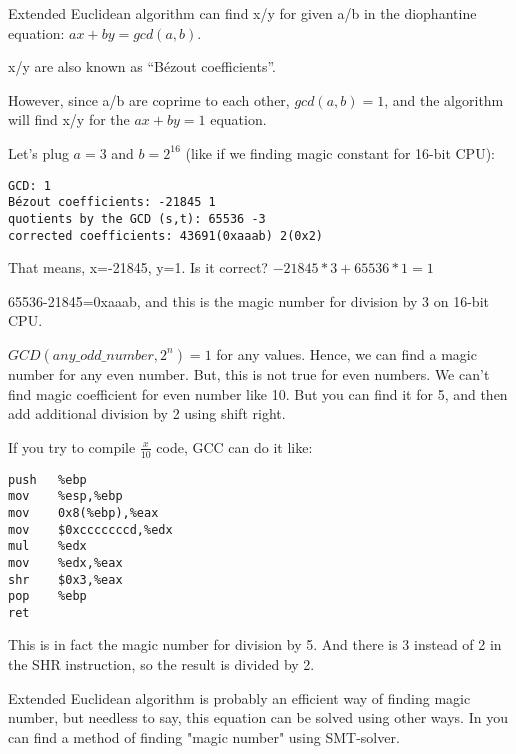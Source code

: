 
Extended Euclidean algorithm can find x/y for given a/b in the diophantine equation:
$ax+by=gcd(a,b)$.

x/y are also known as ``Bézout coefficients''.

However, since a/b are coprime to each other, $gcd(a,b)=1$, and the algorithm will find
x/y for the $ax+by=1$ equation.

Let's plug $a=3$ and $b=2^{16}$ (like if we finding magic constant for 16-bit CPU):



\begin{lstlisting}
GCD: 1
Bézout coefficients: -21845 1
quotients by the GCD (s,t): 65536 -3
corrected coefficients: 43691(0xaaab) 2(0x2)
\end{lstlisting}

That means, x=-21845, y=1.
Is it correct?
$-21845*3 + 65536*1=1$

65536-21845=0xaaab, and this is the magic number for division by 3 on 16-bit CPU.

$GCD(any\_odd\_number, 2^n)=1$ for any values.
Hence, we can find a magic number for any even number.
But, this is not true for even numbers.
We can't find magic coefficient for even number like 10.
But you can find it for 5, and then add additional division by 2 using shift right.

If you try to compile $\frac{x}{10}$ code, GCC can do it like:

\begin{lstlisting}
push   %ebp
mov    %esp,%ebp
mov    0x8(%ebp),%eax
mov    $0xcccccccd,%edx
mul    %edx
mov    %edx,%eax
shr    $0x3,%eax
pop    %ebp
ret    
\end{lstlisting}

This is in fact the magic number for division by 5.
And there is 3 instead of 2 in the SHR instruction, so the result is divided by 2.

Extended Euclidean algorithm is probably an efficient way of finding magic number, but needless to say,
this equation can be solved using other ways.
In \SSBE you can find a method of finding "magic number" using SMT-solver.

